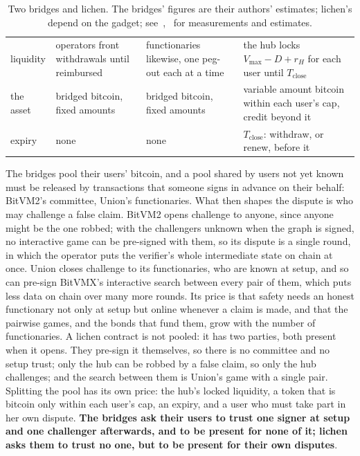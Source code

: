 \documentclass[11pt]{article}
\newcommand{\vmax}{V_{\max}}
\newcommand{\Tc}{T_{\mathrm{close}}}
\begin{document}
\begin{table}[!tp]
\begin{tabularx}{\linewidth}{>{\raggedright\arraybackslash}p{21mm}LLL}
liquidity & operators front withdrawals until reimbursed & functionaries likewise, one peg-out each at a time & the hub locks $\vmax - D + r_H$ for each user until $\Tc$ \\
the asset & bridged bitcoin, fixed amounts & bridged bitcoin, fixed amounts & variable amount bitcoin within each user's cap, credit beyond it \\
expiry & none & none & $\Tc$: withdraw, or renew, before it \\
\bottomrule
\end{tabularx}
\caption{Two bridges and lichen. The bridges' figures are their
authors' estimates; lichen's depend on the gadget; see~\cite{lichenbitvmx},~\cite{lichenbabe} for measurements and estimates.}
\label{tab:bitvm2}
\end{table}

The bridges pool their users' bitcoin, and a pool shared by users not
yet known must be released by transactions that someone signs in
advance on their behalf: BitVM2's committee, Union's functionaries.
What then shapes the dispute is who may challenge a false claim. BitVM2
opens challenge to anyone, since anyone might be the one robbed; with
the challengers unknown when the graph is signed, no interactive game
can be pre-signed with them, so its dispute is a single round, in which
the operator puts the verifier's whole intermediate state on chain at
once. Union closes challenge to its functionaries, who are known at
setup, and so can pre-sign BitVMX's interactive search between every
pair of them, which puts less data on chain over many more rounds. Its
price is that safety needs an honest functionary not only at setup but
online whenever a claim is made, and that the pairwise games, and the
bonds that fund them, grow with the number of functionaries. A lichen
contract is not pooled: it has two parties, both present when it opens.
They pre-sign it themselves, so there is no committee and no setup
trust; only the hub can be robbed by a false claim, so only the hub
challenges; and the search between them is Union's game with a single
pair. Splitting the pool has its own price: the hub's locked liquidity,
a token that is bitcoin only within each user's cap, an expiry, and a
user who must take part in her own dispute. \textbf{The bridges ask their users
to trust one signer at setup and one challenger afterwards, and to be
present for none of it; lichen asks them to trust no one, but to be
present for their own disputes}.
\end{document}
